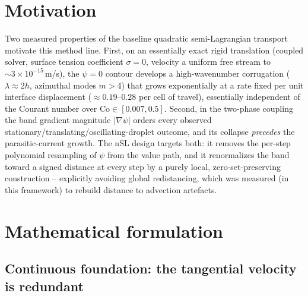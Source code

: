 \documentclass[preprint,3p,11pt]{elsarticle}
\newcommand{\psilev}{\psi}
\newcommand{\gradpsi}{\lvert\nabla\psilev\rvert}
\begin{document}
\section{Motivation}
\label{sec:motivation}

Two measured properties of the baseline quadratic semi-Lagrangian transport
motivate this method line. First, on an essentially exact rigid translation
(coupled solver, surface tension coefficient $\sigma=0$, velocity a uniform
free stream to $\sim\!3\times10^{-15}$\,m/s), the $\psilev=0$ contour develops
a high-wavenumber corrugation ($\lambda\approx2h$, azimuthal modes $m>4$) that
grows exponentially at a rate fixed per unit interface displacement
($\approx0.19$--$0.28$ per cell of travel), essentially independent of the
Courant number over $\mathrm{Co}\in[0.007,0.5]$. Second, in the two-phase
coupling the band gradient magnitude $\gradpsi$ orders every observed
stationary/translating/oscillating-droplet outcome, and its collapse
\emph{precedes} the parasitic-current growth. The nSL design targets both: it
removes the per-step polynomial resampling of $\psilev$ from the value path,
and it renormalizes the band toward a signed distance at every step by a
purely local, zero-set-preserving construction -- explicitly avoiding global
redistancing, which was measured (in this framework) to rebuild distance to
advection artefacts.

\section{Mathematical formulation}
\label{sec:method}

\subsection{Continuous foundation: the tangential velocity is redundant}
\label{sec:exact}
\end{document}
